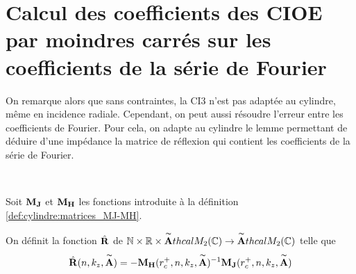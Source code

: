 \section{Calcul des coefficients des CIOE par moindres carrés sur les coefficients de la série de Fourier}

  On remarque alors que sans contraintes, la CI3 n'est pas adaptée au cylindre, même en incidence radiale. Cependant, on peut aussi résoudre l'erreur entre les coefficients de Fourier. Pour cela, on adapte au cylindre le lemme permettant de déduire d'une impédance la matrice de réflexion qui contient les coefficients de la série de Fourier.

  \begin{defn}\label{def:cylindre:reflexion_from_impedance}{}~

    Soit \(\mathbf{M}_{\mathbf{J}}\) et \(\mathbf{M}_{\mathbf{H}}\) les fonctions introduite à la définition \ref{def:cylindre:matrices_MJ-MH}.

    On définit la fonction \(\hat{\mathbf{R}}\) de \(\mathbb N\times\mathbb R\times\overset{\thicksim}{\mathbf{A}}thcal{M}_2(\mathbb C) \rightarrow \overset{\thicksim}{\mathbf{A}}thcal{M}_2(\mathbb C)\) telle que
    \begin{equation*}
      \hat{\mathbf{R}}(n,k_z,\overset{\thicksim}{\mathbf{A}}) = - \mathbf{M}_{\mathbf{H}}(r_c^+,n,k_z,\overset{\thicksim}{\mathbf{A}})^{-1}\mathbf{M}_{\mathbf{J}}(r_c^+,n,k_z,\overset{\thicksim}{\mathbf{A}})
    \end{equation*}
  \end{defn}



